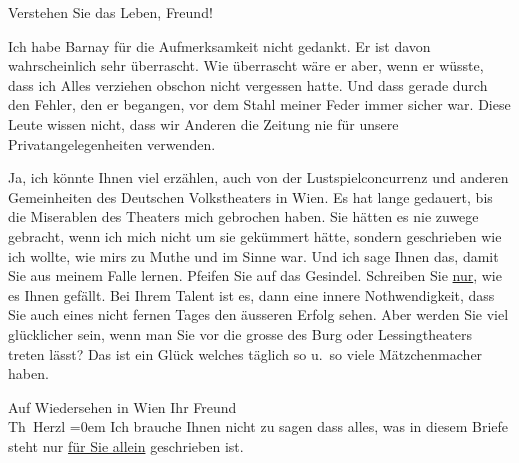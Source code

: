 \pstart
           Verstehen Sie das Leben, Freund!\pend
           
\pstart
           Ich habe Barnay für die Aufmerksamkeit nicht
          gedankt. Er ist davon wahrscheinlich sehr überrascht. Wie überrascht wäre er aber, wenn er
          wüsste, dass ich Alles verziehen  obschon nicht
          vergessen hatte. Und dass \label{T_L03830-1v}\label{T_L03830-1} gerade
          durch den Fehler, den er begangen, vor dem Stahl meiner Feder immer sicher war. Diese
          Leute wissen nicht, dass wir Anderen die Zeitung nie für unsere Privatangelegenheiten
          verwenden.\pend
           
\pstart
           Ja, ich könnte Ihnen viel erzählen, auch von der Lustspielconcurrenz und anderen
          Gemeinheiten des Deutschen Volkstheaters in Wien.  Es hat lange gedauert, bis die Miserablen des {\pb}Theaters mich gebrochen haben. Sie hätten es nie
          zuwege gebracht, wenn ich mich nicht um sie gekümmert hätte, sondern geschrieben wie ich
          wollte, wie mirs zu Muthe und im Sinne war. Und ich sage Ihnen das, damit Sie aus meinem
          Falle lernen. Pfeifen Sie auf das Gesindel. Schreiben Sie \uline{nur}, wie es Ihnen gefällt. Bei Ihrem Talent ist es, dann eine innere
          Nothwendigkeit, dass Sie auch eines nicht fernen Tages den äusseren Erfolg sehen. Aber
          werden Sie viel glücklicher sein, wenn man Sie  vor
          die grosse \label{K_L03830-16v}\label{K_L03830-16}{ }des Burg oder Lessingtheaters treten lässt? Das ist ein Glück welches
          täglich so u. so viele Mätzchenmacher haben.\pend
           
\pstart
           Auf Wiedersehen in Wien Ihr Freund{\\[\baselineskip]}\spacefill\mbox{Th Herzl}\pend
           \leftskip=0em{}
\pstart
           \noindent{}Ich brauche Ihnen nicht zu sagen dass alles, was in diesem Briefe steht nur \uline{für Sie allein} geschrieben ist.\pend
           \endnumbering{}  \newcommand{\dateiname}{L03830}\newcommand{\titel}{Theodor Herzl an Arthur Schnitzler, 15. 6. 1893}\newcommand{\editorInnen}{Selma Jahnke und Martin Anton Müller}
